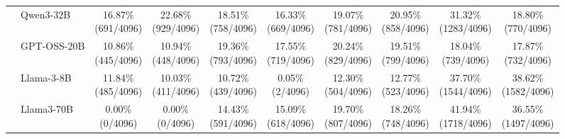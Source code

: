 \begin{table}[t]
{\begin{tabular}{ll*{8}{c}}
 & Qwen3-32B & \makecell[c]{16.87\%\\[-1pt]\scriptsize(691/4096)} & \makecell[c]{22.68\%\\[-1pt]\scriptsize(929/4096)} & \makecell[c]{18.51\%\\[-1pt]\scriptsize(758/4096)} & \makecell[c]{16.33\%\\[-1pt]\scriptsize(669/4096)} & \makecell[c]{19.07\%\\[-1pt]\scriptsize(781/4096)} & \makecell[c]{20.95\%\\[-1pt]\scriptsize(858/4096)} & \makecell[c]{31.32\%\\[-1pt]\scriptsize(1283/4096)} & \makecell[c]{18.80\%\\[-1pt]\scriptsize(770/4096)} \\
 & GPT-OSS-20B & \makecell[c]{10.86\%\\[-1pt]\scriptsize(445/4096)} & \makecell[c]{10.94\%\\[-1pt]\scriptsize(448/4096)} & \makecell[c]{19.36\%\\[-1pt]\scriptsize(793/4096)} & \makecell[c]{17.55\%\\[-1pt]\scriptsize(719/4096)} & \makecell[c]{20.24\%\\[-1pt]\scriptsize(829/4096)} & \makecell[c]{19.51\%\\[-1pt]\scriptsize(799/4096)} & \makecell[c]{18.04\%\\[-1pt]\scriptsize(739/4096)} & \makecell[c]{17.87\%\\[-1pt]\scriptsize(732/4096)} \\
 & Llama-3-8B & \makecell[c]{11.84\%\\[-1pt]\scriptsize(485/4096)} & \makecell[c]{10.03\%\\[-1pt]\scriptsize(411/4096)} & \makecell[c]{10.72\%\\[-1pt]\scriptsize(439/4096)} & \makecell[c]{0.05\%\\[-1pt]\scriptsize(2/4096)} & \makecell[c]{12.30\%\\[-1pt]\scriptsize(504/4096)} & \makecell[c]{12.77\%\\[-1pt]\scriptsize(523/4096)} & \makecell[c]{37.70\%\\[-1pt]\scriptsize(1544/4096)} & \makecell[c]{38.62\%\\[-1pt]\scriptsize(1582/4096)} \\
 & Llama3-70B & \makecell[c]{0.00\%\\[-1pt]\scriptsize(0/4096)} & \makecell[c]{0.00\%\\[-1pt]\scriptsize(0/4096)} & \makecell[c]{14.43\%\\[-1pt]\scriptsize(591/4096)} & \makecell[c]{15.09\%\\[-1pt]\scriptsize(618/4096)} & \makecell[c]{19.70\%\\[-1pt]\scriptsize(807/4096)} & \makecell[c]{18.26\%\\[-1pt]\scriptsize(748/4096)} & \makecell[c]{41.94\%\\[-1pt]\scriptsize(1718/4096)} & \makecell[c]{36.55\%\\[-1pt]\scriptsize(1497/4096)} \\

\end{tabular}}
\end{table}
